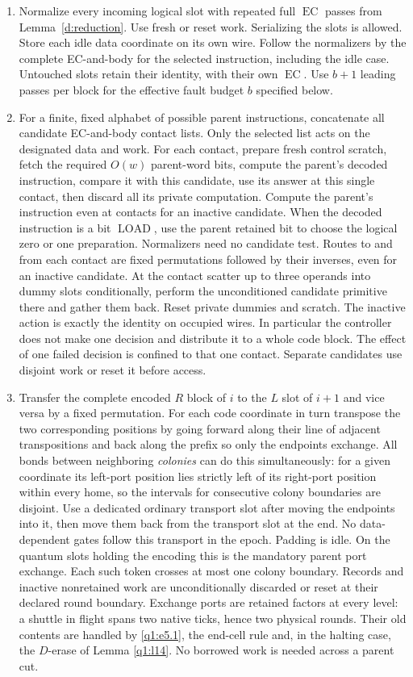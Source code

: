 \begin{enumerate}[label=\arabic*.]
\item Normalize every incoming logical slot with repeated full \(\operatorname{EC}\) passes from Lemma~\ref{d:reduction}. Use fresh or reset work. Serializing the slots is allowed. Store each idle data coordinate on its own wire. Follow the normalizers by the complete EC-and-body for the selected instruction, including the idle case. Untouched slots retain their identity, with their own \(\operatorname{EC}\). Use \(b+1\) leading passes per block for the effective fault budget \(b\) specified below.
\item For a finite, fixed alphabet of possible parent instructions, concatenate all candidate EC-and-body contact lists. Only the selected list acts on the designated data and work. For each contact, prepare fresh control scratch, fetch the required \(O(w)\) parent-word bits, compute the parent's decoded instruction, compare it with this candidate, use its answer at this single contact, then discard all its private computation. Compute the parent's instruction even at contacts for an inactive candidate. When the decoded instruction is a bit \(\operatorname{LOAD}\), use the parent retained bit to choose the logical zero or one preparation. Normalizers need no candidate test. Routes to and from each contact are fixed permutations followed by their inverses, even for an inactive candidate. At the contact scatter up to three operands into dummy slots conditionally, perform the unconditioned candidate primitive there and gather them back. Reset private dummies and scratch. The inactive action is exactly the identity on occupied wires. In particular the controller does not make one decision and distribute it to a whole code block. The effect of one failed decision is confined to that one contact. Separate candidates use disjoint work or reset it before access.
\item Transfer the complete encoded \(R\) block of \(i\) to the \(L\) slot of \(i+1\) and vice versa by a fixed permutation. For each code coordinate in turn transpose the two corresponding positions by going forward along their line of adjacent transpositions and back along the prefix so only the endpoints exchange. All bonds between neighboring \emph{colonies} can do this simultaneously: for a given coordinate its left-port position lies strictly left of its right-port position within every home, so the intervals for consecutive colony boundaries are disjoint. Use a dedicated ordinary transport slot after moving the endpoints into it, then move them back from the transport slot at the end. No data-dependent gates follow this transport in the epoch. Padding is idle. On the quantum slots holding the encoding this is the mandatory parent port exchange. Each such token crosses at most one colony boundary. Records and inactive nonretained work are unconditionally discarded or reset at their declared round boundary. Exchange ports are retained factors at every level: a shuttle in flight spans two native ticks, hence two physical rounds. Their old contents are handled by \eqref{q1:e5.1}, the end-cell rule and, in the halting case, the \(D\)-erase of Lemma \ref{q1:l14}. No borrowed work is needed across a parent cut.

\end{enumerate}
